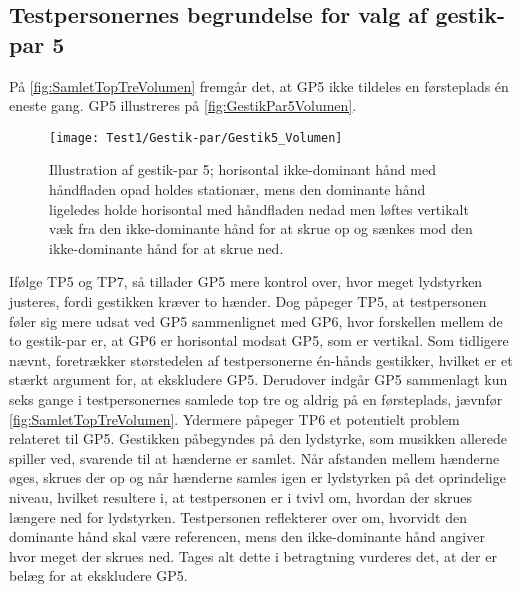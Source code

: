 \subsection{Testpersonernes begrundelse for valg af gestik-par 5}
\label{TestresultaterValgAfGestikkerBegrundelseGP5Volumen}
% 
På \autoref{fig:SamletTopTreVolumen} fremgår det, at GP5 ikke tildeles en førsteplads én eneste gang. GP5 illustreres på \autoref{fig:GestikPar5Volumen}.  
%
\begin{figure}[H]
	\centering
	\texttt{[image: Test1/Gestik-par/Gestik5\_Volumen]}
	\caption{Illustration af gestik-par 5; horisontal ikke-dominant hånd med håndfladen opad holdes stationær, mens den dominante hånd ligeledes holde horisontal med håndfladen nedad men løftes vertikalt væk fra den ikke-dominante hånd for at skrue op og sænkes mod den ikke-dominante hånd for at skrue ned.}
	\label{fig:GestikPar5Volumen}
\end{figure}
\noindent
%
Ifølge TP5 og TP7, så tillader GP5 mere kontrol over, hvor meget lydstyrken justeres, fordi gestikken kræver to hænder. Dog påpeger TP5, at testpersonen føler sig mere udsat ved GP5 sammenlignet med GP6, hvor forskellen mellem de to gestik-par er, at GP6 er horisontal modsat GP5, som er vertikal.\blankline
%
Som tidligere nævnt, foretrækker størstedelen af testpersonerne én-hånds gestikker, hvilket er et stærkt argument for, at ekskludere GP5. Derudover indgår GP5 sammenlagt kun seks gange i testpersonernes samlede top tre og aldrig på en førsteplads, jævnfør \autoref{fig:SamletTopTreVolumen}. Ydermere påpeger TP6 et potentielt problem relateret til GP5. Gestikken påbegyndes på den lydstyrke, som musikken allerede spiller ved, svarende til at hænderne er samlet. Når afstanden mellem hænderne øges, skrues der op og når hænderne samles igen er lydstyrken på det oprindelige niveau, hvilket resultere i, at testpersonen er i tvivl om, hvordan der skrues længere ned for lydstyrken. Testpersonen reflekterer over om, hvorvidt den dominante hånd skal være referencen, mens den ikke-dominante hånd angiver hvor meget der skrues ned. Tages alt dette i betragtning vurderes det, at der er belæg for at ekskludere GP5.
%

